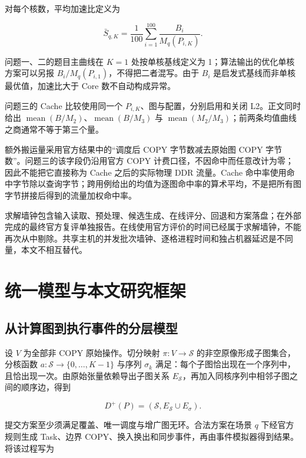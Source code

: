 \documentclass[anonymous,notoc]{gmcm2026}
\begin{document}
对每个核数，平均加速比定义为

\[\bar S_{q,K}=\frac1{100}\sum_{i=1}^{100}\frac{B_i}{M_q(P_{i,K})}.\]

问题一、二的题目主曲线在 \(K=1\) 处按单核基线定义为 1；算法输出的优化单核方案可以另报 \(B_i/M_q(P_{i,1})\)，不得把二者混写。由于 \(B_i\) 是启发式基线而非单核最优值，加速比大于 Core 数不自动构成异常。

问题三的 Cache 比较使用同一个 \(P_{i,K}\)、图与配置，分别启用和关闭 L2。正文同时给出 \(\operatorname{mean}(B/M_2)\)、\(\operatorname{mean}(B/M_3)\) 与 \(\operatorname{mean}(M_2/M_3)\)；前两条均值曲线之商通常不等于第三个量。

额外搬运量采用官方结果中的``调度后 COPY 字节数减去原始图 COPY 字节数''。问题三的该字段仍沿用官方 COPY 计费口径，不因命中而任意改计为零；因此不能把它直接称为 Cache 之后的实际物理 DDR 流量。Cache 命中率使用命中字节除以查询字节；跨用例给出的均值为逐图命中率的算术平均，不是把所有图字节拼接后得到的流量加权命中率。

求解墙钟包含输入读取、预处理、候选生成、在线评分、回退和方案落盘；在外部完成的最终官方复评单独报告。在线使用官方评价的时间已经属于求解墙钟，不能再次从中剔除。共享主机的并发批次墙钟、逐格进程时间和独占机器延迟是不同量，本文不相互替代。

\FloatBarrier

\section{统一模型与本文研究框架}\label{ux7edfux4e00ux6a21ux578bux4e0eux672cux6587ux7814ux7a76ux6846ux67b6}

\subsection{从计算图到执行事件的分层模型}\label{ux4eceux8ba1ux7b97ux56feux5230ux6267ux884cux4e8bux4ef6ux7684ux5206ux5c42ux6a21ux578b}

设 \(V\) 为全部非 COPY 原始操作。切分映射 \(\pi:V\to\mathcal S\) 的非空原像形成子图集合，分核函数 \(a:\mathcal S\to\{0,\ldots,K-1\}\) 与序列 \(\sigma_k\) 满足：每个子图恰出现在一个序列中，且恰出现一次。由原始张量依赖导出子图关系 \(E_{\mathcal S}\)，再加入同核序列中相邻子图之间的顺序边，得到

\[D^+(P)=(\mathcal S,E_{\mathcal S}\cup E_\sigma).\]

提交方案至少须满足覆盖、唯一调度与增广图无环。合法方案在场景 \(q\) 下经官方规则生成 Task、边界 COPY、换入换出和同步事件，再由事件模拟器得到结果。将该过程写为
\end{document}
